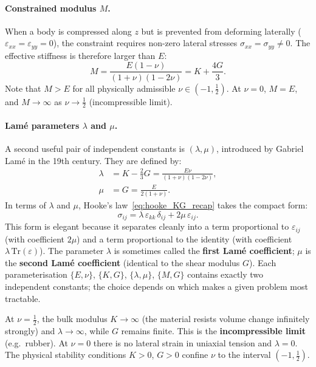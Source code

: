 \paragraph{Constrained modulus $M$.}
When a body is compressed along $z$ but is prevented from deforming laterally ($\varepsilon_{xx}=\varepsilon_{yy}=0$), the constraint requires non-zero lateral stresses $\sigma_{xx}=\sigma_{yy}\neq 0$. The effective stiffness is therefore larger than $E$:
\begin{equation}
    M = \frac{E(1-\nu)}{(1+\nu)(1-2\nu)} = K + \frac{4G}{3}.
    \label{eq:constrained_modulus}
\end{equation}
Note that $M > E$ for all physically admissible $\nu \in (-1,\tfrac{1}{2})$. At $\nu=0$, $M=E$, and $M\to\infty$ as $\nu\to\tfrac{1}{2}$ (incompressible limit).

\paragraph{Lamé parameters $\lambda$ and $\mu$.}
A second useful pair of independent constants is $(\lambda,\mu)$, introduced by Gabriel Lamé in the 19th century. They are defined by:
\begin{align}
    \lambda &= K - \tfrac{2}{3}G = \frac{E\nu}{(1+\nu)(1-2\nu)}, \label{eq:lambda_def}\\[4pt]
    \mu &= G = \frac{E}{2(1+\nu)}. \label{eq:mu_def}
\end{align}
In terms of $\lambda$ and $\mu$, Hooke's law~\eqref{eq:hooke_KG_recap} takes the compact form:
\begin{equation}
    \boxed{\sigma_{ij} = \lambda\,\varepsilon_{kk}\,\delta_{ij} + 2\mu\,\varepsilon_{ij}.}
    \label{eq:hooke_lame}
\end{equation}
This form is elegant because it separates cleanly into a term proportional to $\varepsilon_{ij}$ (with coefficient $2\mu$) and a term proportional to the identity (with coefficient $\lambda\,\mathrm{Tr}(\varepsilon)$). The parameter $\lambda$ is sometimes called the \textbf{first Lamé coefficient}; $\mu$ is the \textbf{second Lamé coefficient} (identical to the shear modulus $G$). Each parameterisation $\{E,\nu\}$, $\{K,G\}$, $\{\lambda,\mu\}$, $\{M,G\}$ contains exactly two independent constants; the choice depends on which makes a given problem most tractable.

\begin{remark}
    At $\nu = \tfrac{1}{2}$, the bulk modulus $K\to\infty$ (the material resists volume change infinitely strongly) and $\lambda\to\infty$, while $G$ remains finite. This is the \textbf{incompressible limit} (e.g.\ rubber). At $\nu=0$ there is no lateral strain in uniaxial tension and $\lambda=0$. The physical stability conditions $K>0$, $G>0$ confine $\nu$ to the interval $(-1,\tfrac{1}{2})$.
\end{remark}

